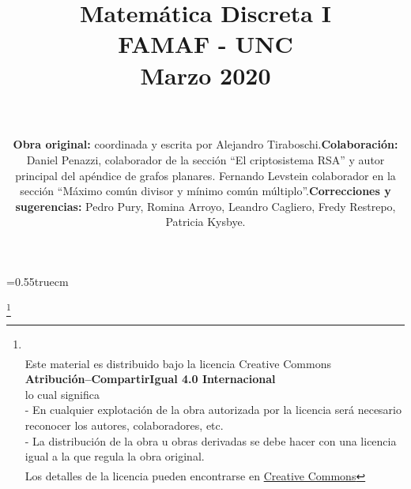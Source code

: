 \documentclass[a4paper,12pt,twoside,spanish]{amsbook}
\theoremstyle{definition}
\theoremstyle{remark}
\begin{document}
\baselineskip=0.55truecm %




\title{Matemática Discreta I \\ FAMAF  - UNC \\ Marzo 2020 }

\maketitle



\author{
${}^{}$
\\${}^{}$
\\${}^{}$
 \\${}^{}$\\ 
\flushleft 
\begin{itemize}
\item \textbf{Obra original:} coordinada y escrita por Alejandro Tiraboschi. 
\item \textbf{Colaboración: } Daniel Penazzi, colaborador  de la sección ``El criptosistema RSA'' y autor principal del apéndice de grafos planares. Fernando Levstein colaborador en la sección ``Máximo común divisor y mínimo común múltiplo''.   
\item \textbf{Correcciones y sugerencias:} Pedro Pury, Romina Arroyo, Leandro Cagliero, Fredy Restrepo, Patricia Kysbye. 
\end{itemize}
}









\vskip 2cm 
\thanks{
 \\
${}^{}$\\
{\flushleft 
Este material es distribuido bajo la licencia Creative Commons} \\
{\center \textbf{Atribución--CompartirIgual 4.0 Internacional}}
\\ 
\center  lo cual significa 
\\
\flushleft
 - En cualquier explotación de la obra autorizada por la licencia será necesario reconocer los autores, colaboradores, etc.\\
 - La distribución de la obra u obras derivadas se debe hacer con una licencia igual a la que regula la obra original.\\
${}^{}$
\\
Los detalles de la licencia pueden encontrarse en \href{https://creativecommons.org/licenses/by/4.0/deed.es}{Creative Commons}
}
\end{document}
